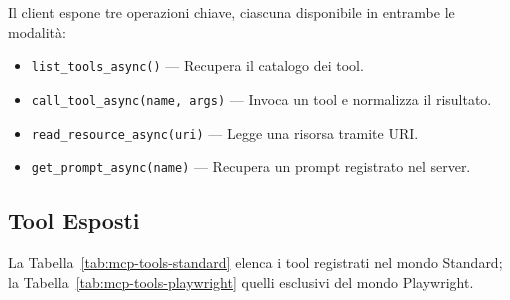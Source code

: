 Il client espone tre operazioni chiave, ciascuna disponibile in entrambe
le modalità:

\begin{itemize}
    \item \texttt{list\_tools\_async()} — Recupera il catalogo dei tool.
    \item \texttt{call\_tool\_async(name, args)} — Invoca un tool e
        normalizza il risultato.
    \item \texttt{read\_resource\_async(uri)} — Legge una risorsa tramite URI.
    \item \texttt{get\_prompt\_async(name)} — Recupera un prompt
        registrato nel server.
\end{itemize}

\subsection{Tool Esposti}
\label{subsec:mcp-tools}

La Tabella~\ref{tab:mcp-tools-standard} elenca i tool registrati nel
mondo Standard; la Tabella~\ref{tab:mcp-tools-playwright} quelli
esclusivi del mondo Playwright.

